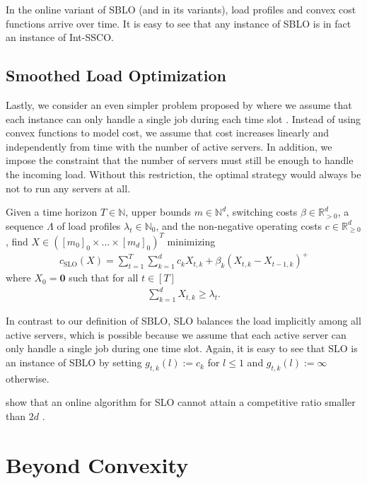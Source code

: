 In the online variant of SBLO (and in its variants), load profiles and convex cost functions arrive over time. It is easy to see that any instance of SBLO is in fact an instance of Int-SSCO.

\subsection{Smoothed Load Optimization}

Lastly, we consider an even simpler problem proposed by \citeauthor*{Albers2021} where we assume that each instance can only handle a single job during each time slot \cite{Albers2021}. Instead of using convex functions to model cost, we assume that cost increases linearly and independently from time with the number of active servers. In addition, we impose the constraint that the number of servers must still be enough to handle the incoming load. Without this restriction, the optimal strategy would always be not to run any servers at all.

\begin{problem}\label{problem:sblo}
Given a time horizon $T \in \mathbb{N}$, upper bounds $m \in \mathbb{N}^d$, switching costs $\beta \in \mathbb{R}_{>0}^d$, a sequence $\Lambda$ of load profiles $\lambda_t \in \mathbb{N}_0$, and the non-negative operating costs $c \in \mathbb{R}_{\geq 0}^d$, find $X \in ([m_0]_0 \times \dots \times [m_d]_0)^T$ minimizing \begin{align*}
    c_{\text{SLO}}(X) = \sum_{t=1}^T \sum_{k=1}^d c_k X_{t,k} + \beta_k (X_{t,k} - X_{t-1,k})^+
\end{align*}
where $X_0 = \mathbf{0}$ such that for all $t \in [T]$ \begin{align*}
    \sum_{k=1}^d X_{t,k} \geq \lambda_t.
\end{align*}
\end{problem}

In contrast to our definition of SBLO, SLO balances the load implicitly among all active servers, which is possible because we assume that each active server can only handle a single job during one time slot. Again, it is easy to see that SLO is an instance of SBLO by setting $g_{t,k}(l) := c_k$ for $l \leq 1$ and $g_{t,k}(l) := \infty$ otherwise.

\citeauthor*{Albers2021} show that an online algorithm for SLO cannot attain a competitive ratio smaller than $2d$ \cite{Albers2021}.

\section{Beyond Convexity}\label{section:theory:beyond_convexity}

